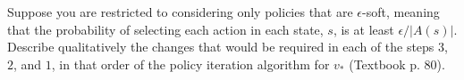 
\begin{exercise}[Exercise 4.6]

Suppose you are restricted to considering only policies that are $\epsilon$-soft, meaning that the probability of selecting each action in each state, $s$, is at least $\epsilon / |A(s)|$.
Describe qualitatively the changes that would be required in each of the steps $3$, $2$, and $1$, in that order of the policy iteration algorithm for $v_\ast$ (Textbook p. 80).

\end{exercise}


